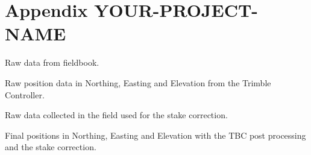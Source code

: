 

\chapter{Appendix YOUR-PROJECT-NAME}
\label{studentxx:appendix}


Raw data from fieldbook.
\begin{table}[h]
	\caption{Raw position data in Northing, Easting and Elevation from the Trimble Controller.}
	\centering
	\begin{turn}{90}
		\scriptsize
		
		\label{GPS:tab:fb_pos_tab}	
	\end{turn}
\end{table}

\begin{table}[h]
	\caption{Raw data collected in the field used for the stake correction.}
	\centering
	\begin{turn}{90}
		\scriptsize
		
		\label{GPS:tab:fb_other_tab}
	\end{turn}
\end{table}

\begin{table}[h]
	\caption{Final positions in Northing, Easting and Elevation with the TBC post processing and the stake correction.}
	\centering 
	\begin{turn}{90}
		\scriptsize
		
		\label{GPS:tab:tbc_tab}
	\end{turn}
\end{table}